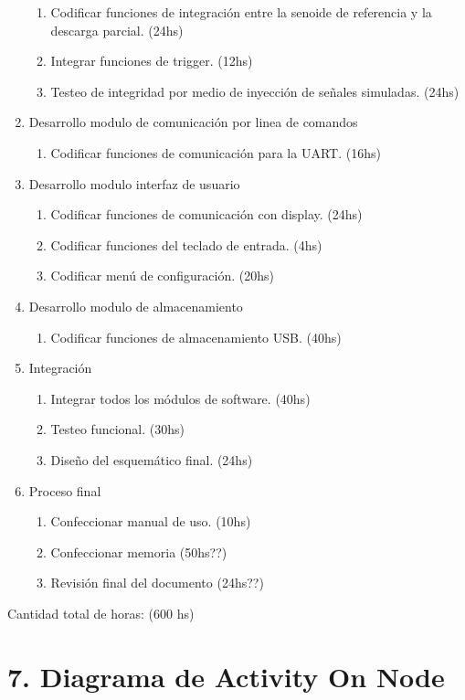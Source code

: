 \documentclass[11pt]{charter}
\begin{document}
\begin{enumerate}
\begin{enumerate}
	\item Codificar funciones de integración entre la senoide de referencia y la descarga parcial. (24hs)
	\item Integrar funciones de trigger. (12hs)
	\item Testeo de integridad por medio de inyección de señales simuladas. (24hs)
	\end{enumerate}
\item Desarrollo modulo de comunicación por linea de comandos
	\begin{enumerate}
	\item Codificar funciones de comunicación para la UART. (16hs)
	\end{enumerate}
\item Desarrollo modulo interfaz de usuario
	\begin{enumerate}
	\item Codificar funciones de comunicación con display. (24hs)
	\item Codificar funciones del teclado de entrada. (4hs)
	\item Codificar menú de configuración. (20hs)
	\end{enumerate}
\item Desarrollo modulo de almacenamiento
	\begin{enumerate}
	\item Codificar funciones de almacenamiento USB. (40hs)
	\end{enumerate}
\item Integración
	\begin{enumerate}
	\item Integrar todos los módulos de software. (40hs) 	
	\item Testeo funcional.	(30hs)
	\item Diseño del esquemático final.	(24hs)
	\end{enumerate}
\item Proceso final
	\begin{enumerate}
	\item Confeccionar manual de uso. (10hs) 	
	\item Confeccionar memoria (50hs??)
	\item Revisión final del documento (24hs??)
	\end{enumerate}
\end{enumerate}

Cantidad total de horas: (600 hs)


\section{7. Diagrama de Activity On Node}
\label{sec:AoN}
\end{document}
